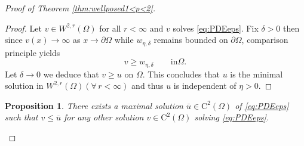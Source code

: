 \documentclass[11pt,reqno]{amsart}
\numberwithin{figure}{section}
\theoremstyle{plain}
\newtheorem{prop}[thm]{Proposition}
\theoremstyle{remark}
\numberwithin{equation}{section}
\begin{document}
\begin{appendices}
\begin{proof} [Proof of Theorem \ref{thm:wellposed1<p<2}]
\begin{proof}
    \noindent Let $v\in W^{2,r}(\Omega)$ for all $r<\infty$ and $v$ solves \eqref{eq:PDEeps}. Fix $\delta>0$ then since $v(x)\to \infty$ as $x\to \partial\Omega$ while $w_{\eta,\delta}$ remains bounded on $\partial \Omega$, comparison principle yields
    \begin{equation*}
        v\geq w_{\eta,\delta} \qquad\text{in}\Omega.
    \end{equation*}
    Let $\delta\to 0$ we deduce that $v\geq u$ on $\Omega$. This concludes that $u$ is the minimal solution in $W^{2,r}(\Omega)(\forall\,r<\infty)$ and thus $u$ is independent of $\eta>0$. 
\end{proof}



\begin{prop} There exists a maximal solution $\overline{u}\in \mathrm{C}^2(\Omega)$ of \eqref{eq:PDEeps} such that $v\leq \overline{u}$ for any other solution $v\in \mathrm{C}^2(\Omega)$ solving \eqref{eq:PDEeps}.
\end{prop}


\end{proof}
\end{appendices}
\end{document}
